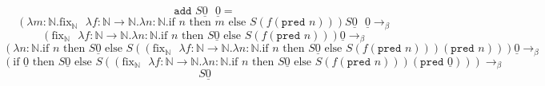 \documentclass{article}
\newcommand{\nat}{\mathbb{N}}
\newcommand{\z}{\underline{0}}
\begin{document}
\begin{landscape}
$$ \texttt{add } S\z\text{ } \z = $$
$$ (\lambda m : \nat.\text{fix}_{\nat}\text{ } \lambda f : \nat \to \nat . \lambda n:\nat. \text{if } n \text{ then } m \text{ else } S( f(\texttt{pred }n))) S\z\text{ } \z 
\to_{\beta}$$
$$ (\text{fix}_{\nat}\text{ } \lambda f : \nat \to \nat . \lambda n:\nat. \text{if } n \text{ then } S\z \text{ else } S( f(\texttt{pred }n))) \z 
\to_{\beta}$$
$$ (\lambda n:\nat. \text{if } n \text{ then } S\z \text{ else } S( (\text{fix}_{\nat}\text{ } \lambda f : \nat \to \nat . \lambda n:\nat. \text{if } n \text{ then } S\z \text{ else } S( f(\texttt{pred }n)))(\texttt{pred }n))) \z 
\to_{\beta}$$
$$ (\text{if } \z \text{ then } S\z \text{ else } S( (\text{fix}_{\nat}\text{ } \lambda f : \nat \to \nat . \lambda n:\nat. \text{if } n \text{ then } S\z \text{ else } S( f(\texttt{pred }n)))(\texttt{pred }\z))) 
\to_{\beta}$$
$$ S\z$$
\end{landscape}
\end{document}
